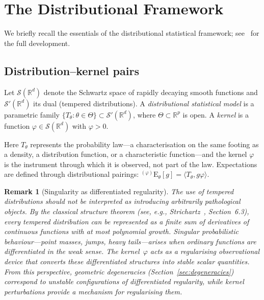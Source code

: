 \documentclass[11pt,a4paper]{article}
\newtheorem{remark}[theorem]{Remark}
\newcommand{\E}{\mathrm{E}}
\newcommand{\R}{\mathbb{R}}
\newcommand{\cS}{\mathcal{S}}
\begin{document}
\section{The Distributional Framework}
\label{sec:distributional}

We briefly recall the essentials of the distributional statistical
framework; see~\cite{A,B} for the full development.

\subsection{Distribution--kernel pairs}

Let $\cS(\R^d)$ denote the Schwartz space of rapidly decaying smooth
functions and $\cS'(\R^d)$ its dual (tempered distributions).  A
\emph{distributional statistical model} is a parametric family
$\{T_\theta : \theta\in\Theta\}\subset\cS'(\R^d)$, where
$\Theta\subset\R^p$ is open.  A \emph{kernel} is a function
$\varphi\in\cS(\R^d)$ with $\varphi>0$.

Here $T_\theta$ represents the probability law---a characterisation on the
same footing as a density, a distribution function, or a characteristic
function---and the kernel $\varphi$ is the instrument through which it is
observed, not part of the law.
Expectations are defined through distributional pairings:
${}^{(\varphi)}\E_\theta[g] = \langle T_\theta, g\varphi\rangle$.

\begin{remark}[Singularity as differentiated regularity]
\label{rem:structure_theorem}
The use of tempered distributions should not be interpreted as
introducing arbitrarily pathological objects.  By the classical
structure theorem (see, e.g., Strichartz~\cite{Strichartz2003},
Section~6.3), every tempered distribution can be represented as a
finite sum of derivatives of continuous functions with at most
polynomial growth.  Singular probabilistic behaviour---point masses,
jumps, heavy tails---arises when ordinary functions are differentiated
in the weak sense.  The kernel~$\varphi$ acts as a regularising
observational device that converts these differentiated structures into
stable scalar quantities.  From this perspective, geometric
degeneracies (Section~\ref{sec:degeneracies}) correspond to unstable
configurations of differentiated regularity, while kernel perturbations
provide a mechanism for regularising them.
\end{remark}
\end{document}
